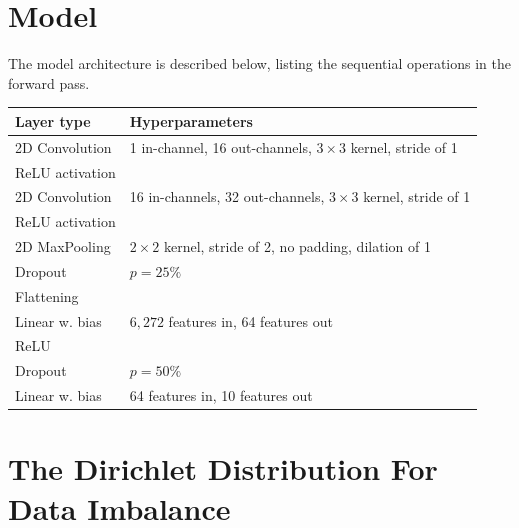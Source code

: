 \documentclass{article}
\begin{document}
\section{Model}
\label{app:model}
The model architecture is described below, listing the sequential operations in the forward pass.
\begin{table}[htb!]
    \centering
    \begin{tabular}{l|p{5cm}}
            Layer type & Hyperparameters\\
            \hline
            2D Convolution & 1 in-channel, 16 out-channels, $3\times 3$ kernel, stride of 1\\
            ReLU activation\\
            2D Convolution & 16 in-channels, 32 out-channels, $3\times 3$ kernel, stride of 1\\
            ReLU activation\\
            2D MaxPooling & $2\times 2$ kernel, stride of 2, no padding, dilation of 1\\
            Dropout & $p=25\%$\\
            Flattening\\
            Linear w. bias & $6,272$ features in, 64 features out\\
            ReLU \\
            Dropout & $p=50\%$\\
            Linear w. bias & 64 features in, 10 features out
        \end{tabular}
\end{table}\noindent
\section{The Dirichlet Distribution For Data Imbalance}
\end{document}
